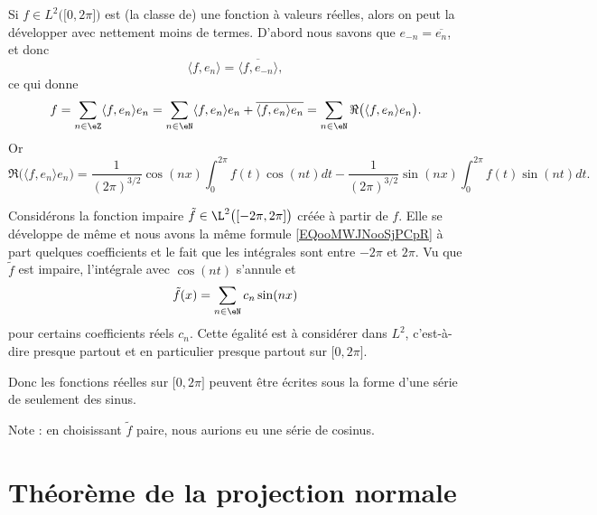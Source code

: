 \begin{example}     \label{EXooQDWUooLtuIOm}
    Si \( f\in L^2\big( \mathopen[ 0 , 2\pi \mathclose] \big)\) est (la classe de) une fonction à valeurs réelles, alors on peut la développer avec nettement moins de termes. D'abord nous savons que \( e_{-n}=\overline{ e_n }\), et donc
    \begin{equation}
        \langle f, e_n\rangle =\overline{ \langle f, e_{-n}\rangle  },
    \end{equation}
    ce qui donne
    \begin{equation}
        f=\sum_{n\in\eZ}\langle f, e_n\rangle e_n=\sum_{n\in \eN}\langle f, e_n\rangle e_n +\overline{ \langle f, e_n\rangle e_n }=\sum_{n\in \eN}\Re\big( \langle f, e_n\rangle e_n \big).
    \end{equation}
    Or
    \begin{equation}        \label{EQooMWJNooSjPCpR}
        \Re\big( \langle f, e_n\rangle e_n \big)=\frac{1}{ (2\pi)^{3/2} }\cos(nx)\int_0^{2\pi}f(t)\cos(nt)dt-\frac{1}{ (2\pi)^{3/2} }\sin(nx)\int_0^{2\pi}f(t)\sin(nt)dt.
    \end{equation}

    Considérons la fonction impaire \( \tilde f\in\L^2\big( [-2\pi,2\pi] \big)\) créée à partir de \( f\). Elle se développe de même et nous avons la même formule \eqref{EQooMWJNooSjPCpR} à part quelques coefficients et le fait que les intégrales sont entre \( -2\pi\) et \( 2\pi\). Vu que \( \tilde f\) est impaire, l'intégrale avec \( \cos(nt)\) s'annule et
    \begin{equation}
        \tilde f(x)=\sum_{n\in \eN}c_n\sin(nx)
    \end{equation}
    pour certains coefficients réels \( c_n\). Cette égalité est à considérer dans \( L^2\), c'est-à-dire presque partout et en particulier presque partout sur \( \mathopen[ 0 , 2\pi \mathclose]\).

    Donc les fonctions réelles sur \( \mathopen[ 0 , 2\pi \mathclose]\) peuvent être écrites sous la forme d'une série de seulement des sinus.

    Note : en choisissant \( \tilde f\) paire, nous aurions eu une série de cosinus.
\end{example}

\section{Théorème de la projection normale}


